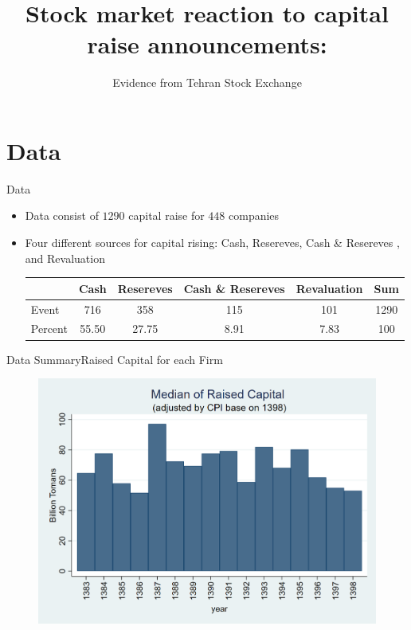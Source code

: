 \documentclass{beamer}
\title[Capital Raise]{Stock market reaction to capital raise announcements:}
\subtitle{Evidence from Tehran Stock Exchange}
\institute[]{Tehran Institute for Advanced Studies }
\begin{document}
	
	{\maketitle}
	
	\section{Data}
	\begin{frame}{Data}
		\begin{itemize}
			\item Data consist of $1290$ capital raise for $448$ companies 
			
			\item Four different sources for capital rising: Cash, Resereves, Cash \& Resereves , and Revaluation \\
			
			\begin{table}[htbp]
				\centering
				\label{t1}
				\resizebox{0.7\textwidth}{!}
				{
					\begin{tabular}{lccccc}
						\hline
						\hline
						& \multicolumn{1}{l}{Cash} & \multicolumn{1}{c}{Resereves} & \multicolumn{1}{c}{Cash \& Resereves} & \multicolumn{1}{c}{Revaluation} &  \multicolumn{1}{c}{Sum} \\
						\hline
						Event & 716   & 358   & 115   & 101   & 1290 \\
						Percent & 55.50 & 27.75 & 8.91  & 7.83  & 100 \\
						\hline\hline
					\end{tabular}
				}
				\label{tab:addlabel}
				
			\end{table}%
			
			
		\end{itemize}
		
	\end{frame}
	
	
	
	
	
	
	\begin{frame}{Data Summary}{Raised Capital for each Firm}
		\begin{figure}
			\centering
			\includegraphics[width=0.7\linewidth]{Output/MedianCapRaiseAdjusted.png}
			\label{fig:mediancapraise}
		\end{figure}
	\end{frame}
	
\end{document}

